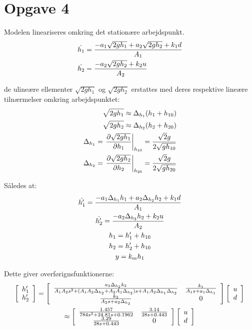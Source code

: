 \section{Opgave 4}
Modelen lineariseres omkring det stationære arbejdspunkt.
\begin{align*}
\dot{h_1} &= \frac{-a_1\sqrt{2gh_1} + a_2\sqrt{2gh_2} + k_1d}{A_1}\\
\dot{h_2} &= \frac{-a_2\sqrt{2gh_2} + k_2u}{A_2}\\
\end{align*}

de ulineære ellementer $\sqrt{2gh_1}$ og $\sqrt{2gh_2}$ erstattes med deres
respektive lineære tilnærmelser omkring arbejdspunktet:
\begin{align*}
\sqrt{2gh_1} \approx \Delta_{h_1}(h_1 + h_{10})\\
\sqrt{2gh_2} \approx \Delta_{h_2}(h_2 + h_{20})\\
\Delta_{h_1} = \left.\frac{\partial {\sqrt{2gh_1}}}{\partial {h_1}}\right|_{h_{10}}
 = \frac{\sqrt{2}g}{2\sqrt{gh_{10}}}\\
\Delta_{h_2} = \left.\frac{\partial {\sqrt{2gh_2}}}{\partial {h_2}}\right|_{h_{20}}
 = \frac{\sqrt{2}g}{2\sqrt{gh_{20}}}
\end{align*}

Således at:
\begin{gather*}
\dot{h'_1} = \frac{-a_1\Delta_{h_1}h_1 + a_2\Delta_{h_2}h_2
+ k_1d}{A_1}\\
\dot{h'_2} = \frac{-a_2\Delta_{h_2}h_2 + k_2u}{A_2}\\
h_1 = h'_1 + h_{10}\\
h_2 = h'_2 + h_{10}\\
y = k_m h_1
\end{gather*}

Dette giver overførignsfunktionerne:
\begin{gather*}
\matrix{c}{}{}{ h'_1 \\ h'_2 } =
\matrix{c c}{}{}{
\frac{ a_2 \Delta_{h_2} k_2 }
	{ A_1A_2s^2
	+ ( A_1 A_2 \Delta_{h_2} + A_2 A_1 \Delta_{h_2} ) s
	+ A_1 A_2 \Delta_{h_1} \Delta_{h_2} } &
\frac{k_1}{ A_1 s + a_1 \Delta_{h_1} } \\
\frac{k_2}{ A_2 s + a_2 \Delta_{h_2} } &
0
}
\matrix{c}{}{}{ u \\ d }\\
\approx \matrix{c c}{}{}{
 \frac{1.457}{784 s^2 + 24.81 s + 0.1962} &
 \frac{3.14}{28s + 0.443} \\
\frac{3.29}{28s + 0.443} &
0 
}
\matrix{c}{}{}{ u \\ d }
\end{gather*}

